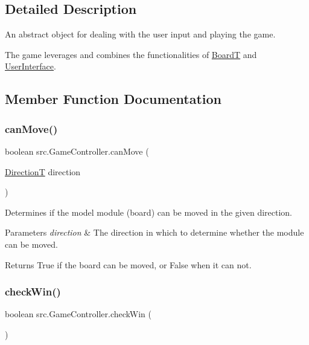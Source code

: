 \subsection{Detailed Description}
An abstract object for dealing with the user input and playing the game. 

The game leverages and combines the functionalities of \hyperlink{classsrc_1_1BoardT}{BoardT} and \hyperlink{classsrc_1_1UserInterface}{User\+Interface}. 

\subsection{Member Function Documentation}
\mbox{\label{classsrc_1_1GameController_aab620640062cc1e977a11d090af2ac46}} 
\subsubsection{\texorpdfstring{can\+Move()}{canMove()}}
{\footnotesize\ttfamily boolean src.\+Game\+Controller.\+can\+Move (\begin{DoxyParamCaption}\item[{\hyperlink{enumsrc_1_1DirectionT}{DirectionT}}]{direction }\end{DoxyParamCaption})}



Determines if the model module (board) can be moved in the given direction. 


\begin{DoxyParams}{Parameters}
{\em direction} & The direction in which to determine whether the module can be moved. \\
\hline
\end{DoxyParams}
\begin{DoxyReturn}{Returns}
True if the board can be moved, or False when it can not. 
\end{DoxyReturn}
\mbox{\label{classsrc_1_1GameController_a5880a025234e64c5ca41a188c4223f19}} 
\subsubsection{\texorpdfstring{check\+Win()}{checkWin()}}
{\footnotesize\ttfamily boolean src.\+Game\+Controller.\+check\+Win (\begin{DoxyParamCaption}{ }\end{DoxyParamCaption})}



